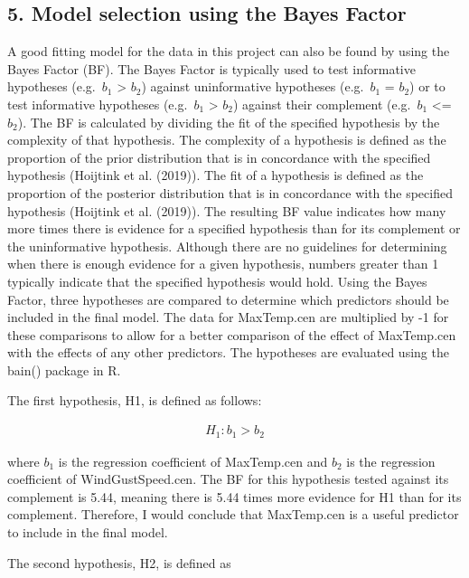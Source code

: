 \documentclass[
]{article}
\begin{document}
\hypertarget{model-selection-using-the-bayes-factor}{%
\subsection{5. Model selection using the Bayes
Factor}\label{model-selection-using-the-bayes-factor}}

A good fitting model for the data in this project can also be found by
using the Bayes Factor (BF). The Bayes Factor is typically used to test
informative hypotheses (e.g.~\(b_1\) \textgreater{} \(b_2\)) against
uninformative hypotheses (e.g.~\(b_1\) = \(b_2\)) or to test informative
hypotheses (e.g.~\(b_1\) \textgreater{} \(b_2\)) against their
complement (e.g.~\(b_1\) \textless= \(b_2\)). The BF is calculated by
dividing the fit of the specified hypothesis by the complexity of that
hypothesis. The complexity of a hypothesis is defined as the proportion
of the prior distribution that is in concordance with the specified
hypothesis (Hoijtink et al. (2019)). The fit of a hypothesis is defined
as the proportion of the posterior distribution that is in concordance
with the specified hypothesis (Hoijtink et al. (2019)). The resulting BF
value indicates how many more times there is evidence for a specified
hypothesis than for its complement or the uninformative hypothesis.
Although there are no guidelines for determining when there is enough
evidence for a given hypothesis, numbers greater than 1 typically
indicate that the specified hypothesis would hold. Using the Bayes
Factor, three hypotheses are compared to determine which predictors
should be included in the final model. The data for MaxTemp.cen are
multiplied by -1 for these comparisons to allow for a better comparison
of the effect of MaxTemp.cen with the effects of any other predictors.
The hypotheses are evaluated using the bain() package in R.

The first hypothesis, H1, is defined as follows:

\begin{align*}
H_1: b_1 > b_2
\end{align*}

where \(b_1\) is the regression coefficient of MaxTemp.cen and \(b_2\)
is the regression coefficient of WindGustSpeed.cen. The BF for this
hypothesis tested against its complement is 5.44, meaning there is 5.44
times more evidence for H1 than for its complement. Therefore, I would
conclude that MaxTemp.cen is a useful predictor to include in the final
model.

The second hypothesis, H2, is defined as
\end{document}
